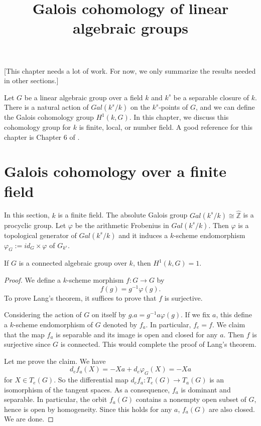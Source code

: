


%


\title{Galois cohomology of linear algebraic groups}


\maketitle

\label{section-phantom}

\tableofcontents

[This chapter needs a lot of work. For now, we only summarize the results needed in other sections.]

Let $G$ be a linear algebraic group over a field $k$ and $k^{s}$ be a separable closure of $k$. There is a natural action of $Gal (k^{s}/k)$ on the $k^{s}$-points of $G$, and we can define the Galois cohomology group $H^{1}(k, G)$. In this chapter, we discuss this cohomology group for $k$ is finite, local, or number field. A good reference for this chapter is Chapter 6 of \cite{Platonov-Rapinchuk}.

\section{Galois cohomology over a finite field}
\label{section-finite-field}


In this section, $k$ is a finite field. The absolute Galois group $Gal(k^{s}/k)\cong \hat{\mathbb{Z}}$ is a procyclic group. Let $\varphi$ be the arithmetic Frobenius in $Gal(k^{s}/k)$. Then $\varphi$ is a topological generator of $Gal(k^{s}/k)$ and it induces a $k$-scheme endomorphism $\varphi_{G}:=id_{G}\times \varphi$ of $G_{k^{s}}$.
\begin{theorem}
 \label{theorem-Lang}
If $G$ is a connected algebraic group over $k$, then $H^1(k, G)=1$. 
\end{theorem}

\begin{proof}
We define a $k$-scheme morphism $f: G\rightarrow G$ by  
\[
f(g)=g^{-1}\varphi (g).
\]
To prove Lang's theorem, it suffices to prove that $f$ is surjective. 

Considering the action of $G$ on itself by $g.a=g^{-1}a\varphi(g)$. If we fix $a$, this define a $k$-scheme endomorphism of $G$ denoted by $f_{a}$. In particular, $f_{e}=f$. We claim that the map $f_{a}$ is separable and its image is open and closed for any $a$. Then $f$ is surjective since $G$ is connected. This would complete the proof of Lang's theorem.

Let me prove the claim. We have 
\[
d_{e}f_{a}(X)=-Xa +d_{e}\varphi_{G}(X)=-Xa
\]
for $X\in T_{e}(G)$. So the differential map $d_{e}f_{a}: T_{e}(G)\rightarrow T_{a}(G)$ is an isomorphism of the tangent spaces. As a consequence, $f_{a}$ is dominant and separable. In particular, the orbit $f_{a}(G)$ contains a nonempty open subset of $G$, hence is open by homogeneity. Since this holds for any $a$, $f_{a}(G)$ are also closed. We are done.
\end{proof}


